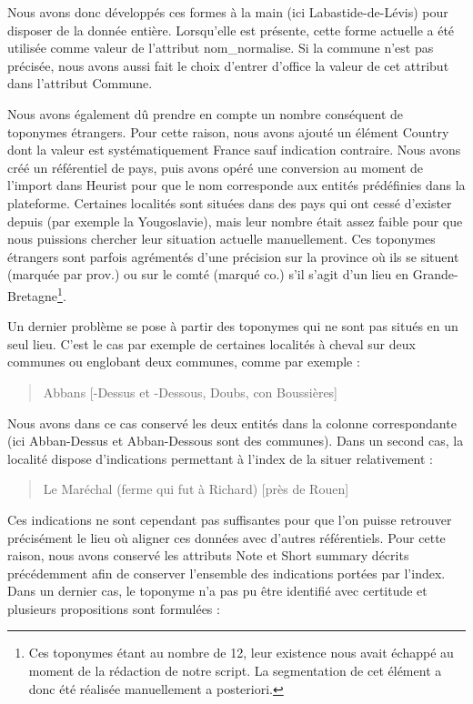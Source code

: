 \documentclass[a4paper,12pt,twoside]{book}
\begin{document}
	\noindent Nous avons donc développés ces formes à la main (ici \og Labastide-de-Lévis\fg{}) pour disposer de la donnée entière. Lorsqu'elle est présente, cette forme actuelle a été utilisée comme valeur de l'attribut \og nom\_normalise\fg{}. Si la commune n'est pas précisée, nous avons aussi fait le choix d'entrer d'office la valeur de cet attribut dans l'attribut \og Commune\fg{}.
	
	Nous avons également dû prendre en compte un nombre conséquent de toponymes étrangers. Pour cette raison, nous avons ajouté un élément \og Country\fg{} dont la valeur est systématiquement \og France\fg{} sauf indication contraire. Nous avons créé un référentiel de pays, puis avons opéré une conversion au moment de l'import dans Heurist pour que le nom corresponde aux entités prédéfinies dans la plateforme. Certaines localités sont situées dans des pays qui ont cessé d'exister depuis (par exemple la Yougoslavie), mais leur nombre était assez faible pour que nous puissions chercher leur situation actuelle manuellement. Ces toponymes étrangers sont parfois agrémentés d'une précision sur la province où ils se situent (marquée par \og prov.\fg{}) ou sur le comté (marqué \og co.\fg{}) s'il s'agit d'un lieu en Grande-Bretagne\footnote{Ces toponymes étant au nombre de 12, leur existence nous avait échappé au moment de la rédaction de notre script. La segmentation de cet élément a donc été réalisée manuellement a posteriori.}.
	
	Un dernier problème se pose à partir des toponymes qui ne sont pas situés en un seul lieu. C'est le cas par exemple de certaines localités à cheval sur deux communes ou englobant deux communes, comme par exemple :
	
	\begin{quotation}
		Abbans [-Dessus et -Dessous, Doubs, con Boussières]
	\end{quotation}
	
	\noindent Nous avons dans ce cas conservé les deux entités dans la colonne correspondante (ici \og Abban-Dessus\fg{} et \og Abban-Dessous\fg{} sont des communes). Dans un second cas, la localité dispose d'indications permettant à l'index de la situer relativement :
	
	\begin{quotation}
		Le Maréchal (ferme qui fut à Richard) [près de Rouen]
	\end{quotation}
	
	\noindent Ces indications ne sont cependant pas suffisantes pour que l'on puisse retrouver précisément le lieu où aligner ces données avec d'autres référentiels. Pour cette raison, nous avons conservé les attributs \og Note\fg{} et \og Short summary\fg{} décrits précédemment afin de conserver l'ensemble des indications portées par l'index. Dans un dernier cas, le toponyme n'a pas pu être identifié avec certitude et plusieurs propositions sont formulées :
	
\end{document}
